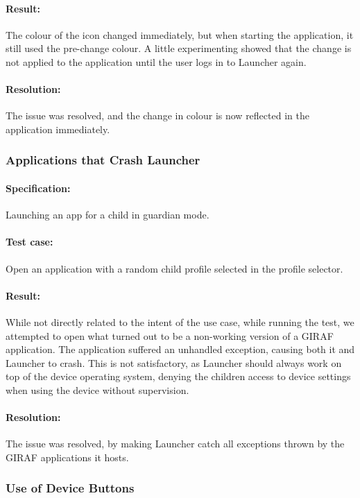 \paragraph{Result:} The colour of the icon changed immediately, but when starting the application, it still used the pre-change colour. A little experimenting showed that the change is not applied to the application until the user logs in to Launcher again.
\paragraph{Resolution:} The issue was resolved, and the change in colour is now reflected in the application immediately.

\subsubsection*{Applications that Crash Launcher}
\paragraph{Specification:} Launching an app for a child in guardian mode.
\paragraph{Test case:} Open an application with a random child profile selected in the profile selector.
\paragraph{Result:} While not directly related to the intent of the use case, while running the test, we attempted to open what turned out to be a non-working version of a GIRAF application. The application suffered an unhandled exception, causing both it and Launcher to crash. This is not satisfactory, as Launcher should always work on top of the device operating system, denying the children access to device settings when using the device without supervision.
\paragraph{Resolution:} The issue was resolved, by making Launcher catch all exceptions thrown by the GIRAF applications it hosts.

\subsubsection*{Use of Device Buttons}
